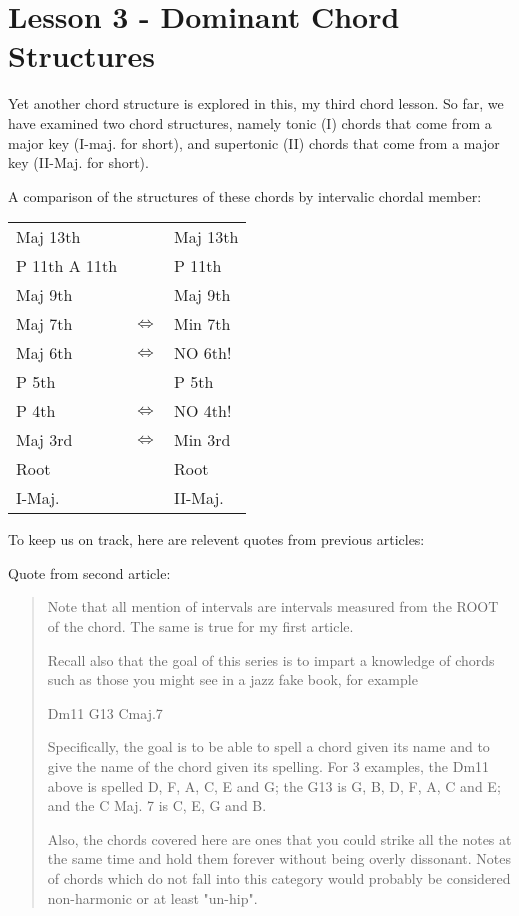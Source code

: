 \section{Lesson 3 - Dominant Chord Structures}

Yet another chord structure is explored in this, my third chord lesson.
So far, we have examined two chord structures, namely tonic (I) chords
that come from a major key (I-maj. for short), and supertonic (II) 
chords that come from a major key (II-Maj. for short).

A comparison of the structures of these chords by intervalic chordal member:

\begin{tabular}{ | l c l | }
	\hline
	Maj 13th					&					& Maj 13th				\\
	P 11th   A 11th   & 				& P 11th					\\
	Maj 9th           & 				& Maj 9th					\\
	Maj 7th    				& $\iff$	& Min 7th					\\
	Maj 6th						& $\iff$	& NO 6th!					\\
	P 5th             & 				& P 5th						\\
	P 4th							& $\iff$	& NO 4th!					\\
	Maj 3rd						& $\iff$	& Min 3rd					\\
	Root              & 				& Root						\\
	\hline
  I-Maj.            & 				& II-Maj.					\\
  \hline
\end{tabular}

To keep us on track, here are relevent quotes from previous articles:

Quote from second article:
\begin{quote}
Note that all mention of intervals are intervals measured from the ROOT
of the chord. The same is true for my first article.

Recall also that the goal of this series is to impart a knowledge of
chords such as those you might see in a jazz fake book, for example

Dm11     G13     Cmaj.7

Specifically, the goal is to be able to spell a chord given its name and
to give the name of the chord given its spelling. For 3 examples, the
Dm11 above is spelled D, F, A, C, E and G; the G13 is G, B, D, F, A, C
and E; and the C Maj. 7 is C, E, G and B.

Also, the chords covered here are ones that you could strike all the
notes at the same time and hold them forever without being overly
dissonant. Notes of chords which do not fall into this category would
probably be considered non-harmonic or at least "un-hip".
\end{quote}

